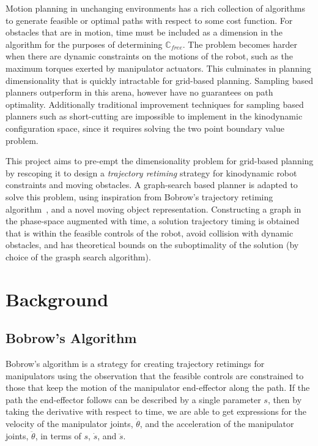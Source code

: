 \documentclass[letterpaper,12pt]{article} %
\begin{document}
Motion planning in unchanging environments has a rich collection of algorithms to generate feasible or optimal paths with respect to some cost function. For obstacles that are in motion, time must be included as a dimension in the algorithm for the purposes of determining $\mathbb{C}_{free}$. The problem becomes harder when there are dynamic constraints on the motions of the robot, such as the maximum torques exerted by manipulator actuators. This culminates in planning dimensionality that is quickly intractable for grid-based planning. Sampling based planners outperform in this arena, however have no guarantees on path optimality. Additionally traditional improvement techniques for sampling based planners such as short-cutting are impossible to implement in the kinodynamic configuration space, since it requires solving the two point boundary value problem.

This project aims to pre-empt the dimensionality problem for grid-based planning by rescoping it to design a \emph{trajectory retiming} strategy for kinodynamic robot constraints and moving obstacles. A graph-search based planner is adapted to solve this problem, using inspiration from Bobrow's trajectory retiming algorithm~\cite{bobrow1985time,shin1985minimum,kunz2012time}, and a novel moving object representation. Constructing a graph in the phase-space augmented with time, a solution trajectory timing is obtained that is within the feasible controls of the robot, avoid collision with dynamic obstacles, and has theoretical bounds on the suboptimality of the solution (by choice of the grasph search algorithm).

\section{Background}\label{sec:framework}

\subsection{Bobrow's Algorithm}\label{subsec:bobrow}

Bobrow's algorithm is a strategy for creating trajectory retimings for manipulators using the observation that the feasible controls are constrained to those that keep the motion of the manipulator end-effector along the path. If the path the end-effector follows can be described by a single parameter $s$, then by taking the derivative with respect to time, we are able to get expressions for the velocity of the manipulator joints, $\dot{\theta}$, and the acceleration of the manipulator joints, $\ddot{\theta}$, in terms of $s$, $\dot{s}$, and $\ddot{s}$. 
\end{document}
